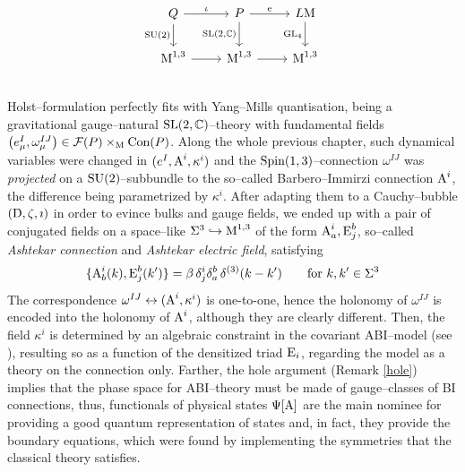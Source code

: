 \[\begin{tikzcd}
Q\arrow{r}{\iota} \arrow[swap]{d}{\SU(2)} & P\arrow{r}{\e}\arrow[swap]{d}{\SL(2,\C)}&L\M\arrow[swap]{d}{\GL_4}\\
\M^{1,3}\arrow{r} & \M^{1,3}\arrow{r} &\M^{1,3}\\
\end{tikzcd}
\]
{Holst--formulation perfectly fits with Yang--Mills quantisation, being a gravitational gauge--natural $\text{\normalfont SL}(2,\mathbb{C})$--theory with fundamental fields $\left(e^I_\mu,\omega^{IJ}_\mu\right)\in\mathcal{F}(P)\times_{\text{\normalfont M}}\text{\normalfont Con}(P)$. Along the whole previous chapter, such dynamical variables were changed in $(e^I,\text{\normalfont A}^i,\kappa^i)$ and the $\text{\normalfont Spin}(1,3)$--connection $\omega^{IJ}$ was \emph{projected} on a $\text{\normalfont SU}(2)$--subbundle to the so--called Barbero--Immirzi connection $\text{\normalfont A}^i$, the difference being parametrized by $\kappa^i$. After adapting them to a Cauchy--bubble $(\text{\normalfont D},\zeta,\imath)$ in order to evince bulks and gauge fields, we ended up with a pair of conjugated fields on a space--like $\Sigma^3\hookrightarrow\text{\normalfont M}^{1,3}$ of the form $\text{\normalfont A}^i_a,\text{\normalfont E}^b_j$, so--called 
\emph{Ashtekar connection} and \emph{Ashtekar electric field}, satisfying
$$\{\text{\normalfont A}^i_b(k),\text{\normalfont E}^b_j(k')\}=\beta\,\delta^i_j\delta^b_a\,\delta^{(3)}(k-k')
\qquad \text{for}\,\,k,k'\in\Sigma^3$$
 The correspondence $\omega^{IJ}\leftrightarrow(\text{\normalfont A}^i,\kappa^i)$ is one-to-one, hence the holonomy of $\omega^{IJ}$ is encoded into the holonomy of $\text{\normalfont A}^i$, although they are clearly different. Then, the field $\kappa^i$ is determined by an algebraic constraint in the covariant ABI--model (see \cite{LN3}), resulting so as a function of the densitized triad $\text{\normalfont E}_i$, regarding the model as a theory on the connection only. Farther, the hole argument (Remark \ref{hole}) implies that the phase space for ABI--theory  must be made of gauge--classes of BI connections, thus, functionals of physical states $\Psi[\text{\normalfont A}]$ are the main nominee for providing a good quantum representation of states and, in fact, they provide the boundary equations, which were found by implementing the symmetries that the classical theory satisfies.} %

